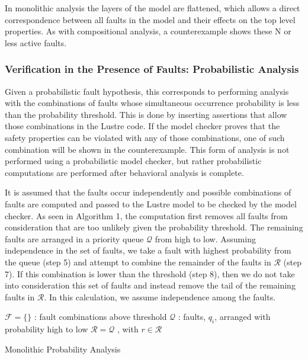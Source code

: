 In monolithic analysis the layers of the model are flattened, which allows a direct correspondence between all faults in the model and their effects on the top level properties. As with compositional analysis, a counterexample shows these N or less active faults. 

\subsubsection{Verification in the Presence of Faults: Probabilistic Analysis} 
Given a probabilistic fault hypothesis, this corresponds to performing analysis with the combinations of faults whose simultaneous occurrence probability is less than the probability threshold. This is done by inserting assertions that allow those combinations in the Lustre code. If the model checker proves that the safety properties can be violated with any of those combinations, one of such combination will be shown in the counterexample. This form of analysis is not performed using a probabilistic model checker, but rather probabilistic computations are performed after behavioral analysis is complete. 

It is assumed that the faults occur independently and possible combinations of faults are computed and passed to the Lustre model to be checked by the model checker. As seen in Algorithm 1, the computation first removes all faults from consideration that are too unlikely given the probability threshold. The remaining faults are arranged in a priority queue $\mathcal{Q}$ from high to low. Assuming independence in the set of faults, we take a fault with highest probability from the queue (step 5) and attempt to combine the remainder of the faults in $\mathcal{R}$ (step 7). If this combination is lower than the threshold (step 8), then we do not take into consideration this set of faults and instead remove the tail of the remaining faults in $\mathcal{R}$. In this calculation, we assume independence among the faults. 
 
\begin{algorithm}[H]
	$\mathcal{F} = \{\}$ : fault combinations above threshold \;
	$\mathcal{Q}$ : faults, $q_i$, arranged with probability high to low \;
	$\mathcal{R} = \mathcal{Q}$ , with $r \in \mathcal{R}$\;
	\caption{Monolithic Probability Analysis}
	\label{alg:prob_monolithic}
\end{algorithm}


